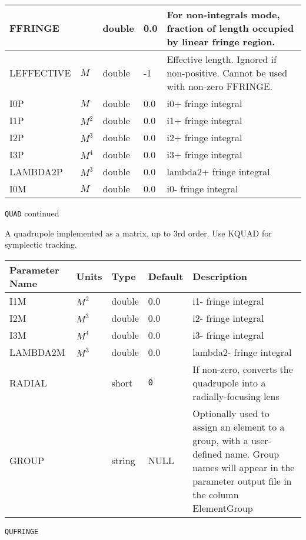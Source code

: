 \begin{tabular}{|l|l|l|l|p{\descwidth}|}
FFRINGE &  & double &  0.0 & For non-integrals mode, fraction of length occupied by linear fringe region.  \\ \hline 
LEFFECTIVE & $M$ & double &   -1 & Effective length. Ignored if non-positive. Cannot be used with non-zero FFRINGE.  \\ \hline 
I0P & $M$ & double &  0.0 & i0+ fringe integral  \\ \hline 
I1P & $M^{2}$ & double &  0.0 & i1+ fringe integral  \\ \hline 
I2P & $M^{3}$ & double &  0.0 & i2+ fringe integral  \\ \hline 
I3P & $M^{4}$ & double &  0.0 & i3+ fringe integral  \\ \hline 
LAMBDA2P & $M^{3}$ & double &  0.0 & lambda2+ fringe integral  \\ \hline 
I0M & $M$ & double &  0.0 & i0- fringe integral  \\ \hline 
\end{tabular}

\newpage
\begin{center}{\Large\verb|QUAD| continued}\end{center}
A quadrupole implemented as a matrix, up to 3rd order. Use KQUAD for symplectic tracking.
\\
\begin{tabular}{|l|l|l|l|p{\descwidth}|} \hline
Parameter Name & Units & Type & Default & Description \\ \hline 
I1M & $M^{2}$ & double &  0.0 & i1- fringe integral  \\ \hline 
I2M & $M^{3}$ & double &  0.0 & i2- fringe integral  \\ \hline 
I3M & $M^{4}$ & double &  0.0 & i3- fringe integral  \\ \hline 
LAMBDA2M & $M^{3}$ & double &  0.0 & lambda2- fringe integral  \\ \hline 
RADIAL &  & short &  \verb|0| & If non-zero, converts the quadrupole into a radially-focusing lens  \\ \hline 
GROUP &  & string & NULL & Optionally used to assign an element to a group, with a user-defined name.  Group names will appear in the parameter output file in the column ElementGroup  \\ \hline 
\end{tabular}

\vspace*{0.5in}

\newpage
\begin{center}{\Large\verb|QUFRINGE|}\end{center}

